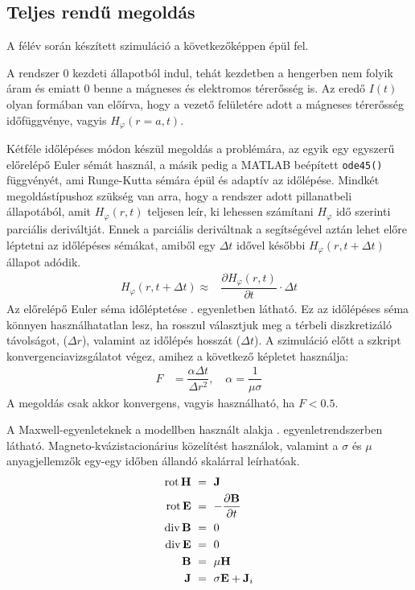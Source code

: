        \subsection{Teljes rendű megoldás}
            A félév során készített szimuláció a következőképpen épül fel.
            \par
            A rendszer 0 kezdeti állapotból indul, tehát kezdetben a hengerben nem folyik áram és emiatt 0 benne a mágneses és elektromos térerősség is. Az eredő $I(t)$ olyan formában van előírva, hogy a vezető felületére adott a mágneses térerősség időfüggvénye, vagyis $H_{\varphi}(r=a,t)$.
            \par
            Kétféle időlépéses módon készül megoldás a problémára, az egyik egy egyszerű előrelépő Euler sémát használ, a másik pedig a MATLAB beépített \verb|ode45()| függvényét, ami Runge-Kutta sémára épül és adaptív az időlépése. Mindkét megoldástípushoz szükség van arra, hogy a rendszer adott pillanatbeli állapotából, amit $H_{\varphi}(r,t)$ teljesen leír, ki lehessen számítani $H_{\varphi}$ idő szerinti parciális deriváltját. Ennek a parciális deriváltnak a segítségével aztán lehet előre léptetni az időlépéses sémákat, amiből egy $\Delta t$ idővel későbbi $H_{\varphi}(r,t+\Delta t)$ állapot adódik.
            \begin{align}
                \label{equ:fe}
                H_{\varphi}(r,t+\Delta t) \approx & \dfrac{\partial H_{\varphi}(r,t)}{\partial t} \cdot \Delta t
            \end{align}
            Az előrelépő Euler séma időléptetése . egyenletben látható. Ez az időlépéses séma könnyen használhatatlan lesz, ha rosszul választjuk meg a térbeli diszkretizáló távolságot, ($\Delta r$), valamint az időlépés hosszát ($\Delta t$). A szimuláció előtt a szkript konvergenciavizsgálatot végez, amihez a következő képletet használja:
            \begin{align}
                F &= \dfrac{\alpha \Delta t}{\Delta r^2}, \quad \alpha = \dfrac{1}{\mu \sigma}
            \end{align}
            A megoldás csak akkor konvergens, vagyis használható, ha $F<0.5$.
            \par
            A Maxwell-egyenleteknek a modellben használt alakja . egyenletrendszerben látható. Magneto-kvázistacionárius közelítést használok, valamint a $\sigma$ és $\mu$ anyagjellemzők egy-egy időben állandó skalárral leírhatóak.
            \begin{equation}\label{equ:maxwell}
                \begin{aligned}
                \operatorname{rot} \textbf{H}~&=~{\bf J} \\
                \operatorname{rot} \textbf{E}~&=~-\dfrac{\partial \textbf{B}}{\partial t} \\
                \operatorname{div} \textbf{B}~&=~0 \\
                \operatorname{div} \textbf{E}~&=~0 \\
                \textbf{B}~&=~\mu \textbf{H} \\
                \textbf{J}~&=~\sigma\textbf{E} + \textbf{J}_i
                \end{aligned}
            \end{equation}%
